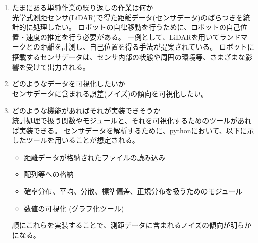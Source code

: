 \begin{enumerate}
  \item たまにある単純作業の繰り返しの作業は何か \\
  光学式測距センサ(LiDAR)で得た距離データ(センサデータ)のばらつきを統計的に処理したい。
  ロボットの自律移動を行うために、ロボットの自己位置・速度の推定を行う必要がある。
  一例として、LiDARを用いてランドマークとの距離を計測し、自己位置を得る手法が提案されている。
  ロボットに搭載するセンサデータは、センサ内部の状態や周囲の環境等、さまざまな影響を受けて出力される。
  \item どのようなデータを可視化したいか\\
  センサデータに含まれる誤差(ノイズ)の傾向を可視化したい。

  \item どのような機能があればそれが実装できそうか\\
  統計処理で扱う関数やモジュールと、それを可視化するためのツールがあれば実装できる。
  センサデータを解析するために、pythonにおいて、以下に示したツールを用いることが想定される。
    \begin{itemize}
      \setlength{\parskip}{0cm} %
      \setlength{\itemsep}{0cm} %
      \item 距離データが格納されたファイルの読み込み
      \item 配列等への格納
      \item 確率分布、平均、分散、標準偏差、正規分布を扱うためのモジュール
      \item 数値の可視化 (グラフ化ツール)
    \end{itemize}
  順にこれらを実装することで、測距データに含まれるノイズの傾向が明らかになる。
\end{enumerate}